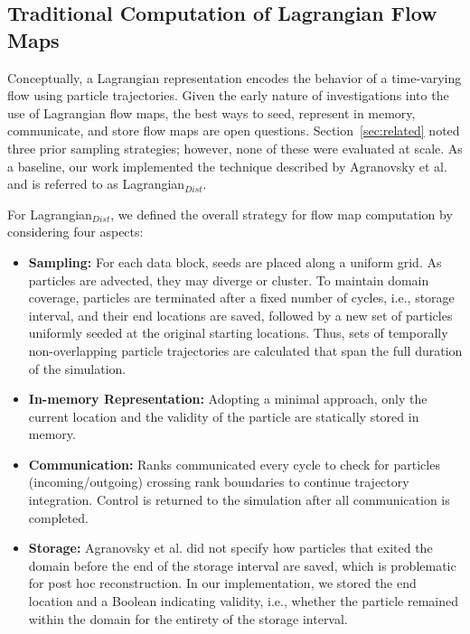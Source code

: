 

\vspace{-2mm}
\subsection{Traditional Computation of Lagrangian Flow Maps}
\label{sec:baseline}
Conceptually, a Lagrangian representation encodes the behavior of a time-varying flow using particle trajectories.
%
Given the early nature of investigations into the use of Lagrangian flow maps, the best ways to seed, represent in memory, communicate, and store flow maps are open questions. 
%
Section~\ref{sec:related} noted three prior sampling strategies; however, none of these were evaluated at scale.
%
As a baseline, our work implemented the technique described by Agranovsky et al.~\cite{agranovsky2014improved}
%
and is referred to as Lagrangian$_{Dist}$.

For Lagrangian$_{Dist}$, we defined the overall strategy for flow map computation by considering four aspects:
%
\vspace{-1mm}
\begin{itemize}[leftmargin=*]
\item\textbf{Sampling:} For each data block, seeds are placed along a uniform grid. As particles are advected, they may diverge or cluster. 
%
To maintain domain coverage, particles are terminated after a fixed number of cycles, i.e., storage interval, and their end locations are saved, followed by a new set of particles uniformly seeded at the original starting locations.
%
Thus, sets of temporally non-overlapping particle trajectories are calculated that span the full duration of the simulation.
%
\item\textbf{In-memory Representation:} 
%
Adopting a minimal approach, only the current location and the validity of the particle are statically stored in memory. 
%
\item\textbf{Communication:} Ranks communicated every cycle to check for particles (incoming/outgoing) crossing rank boundaries to continue trajectory integration. 
%
Control is returned to the simulation after all communication is completed.
\item\textbf{Storage:} Agranovsky et al. did not specify how particles that exited the domain before the end of the storage interval are saved,
%
which is problematic for post hoc reconstruction. 
%
In our implementation, we stored the end location and a Boolean indicating validity, i.e., whether the particle remained within the domain for the entirety of the storage interval. 
%
\vspace{-1mm}
\end{itemize}


